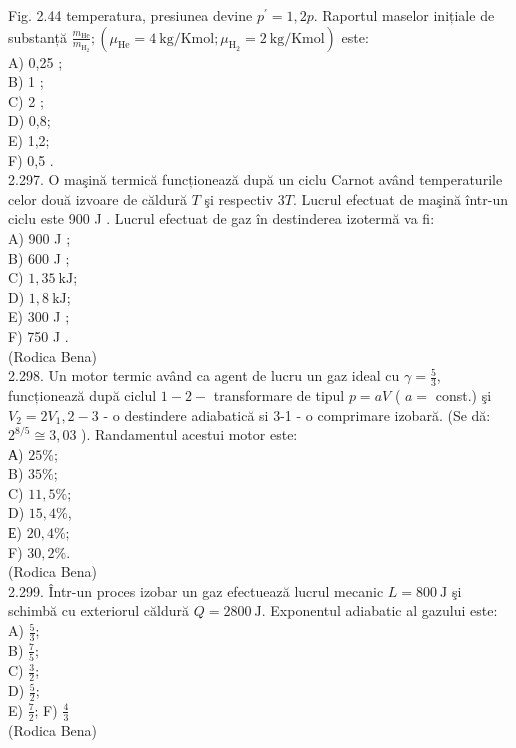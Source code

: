 \documentclass[10pt]{article}
\begin{document}
Fig. 2.44 temperatura, presiunea devine $p^{\prime}=1,2 p$. Raportul maselor inițiale de substanță $\frac{m_{\mathrm{He}}}{m_{\mathrm{H}_{2}}} ;\left(\mu_{\mathrm{He}}=4 \mathrm{~kg} / \mathrm{Kmol} ; \mu_{\mathrm{H}_{2}}=2 \mathrm{~kg} / \mathrm{Kmol}\right)$ este:\\
A) 0,25 ;\\
B) 1 ;\\
C) 2 ;\\
D) 0,8;\\
E) 1,2;\\
F) 0,5 .\\
2.297. O maşină termică funcționează după un ciclu Carnot având temperaturile celor două izvoare de căldură $T$ şi respectiv $3 T$. Lucrul efectuat de maşină într-un ciclu este 900 J . Lucrul efectuat de gaz în destinderea izotermă va fi:\\
A) 900 J ;\\
B) 600 J ;\\
C) $1,35 \mathrm{~kJ}$;\\
D) $1,8 \mathrm{~kJ}$;\\
E) 300 J ;\\
F) 750 J .\\
(Rodica Bena)\\
2.298. Un motor termic având ca agent de lucru un gaz ideal cu $\gamma=\frac{5}{3}$, funcționează după ciclul $1-2-$ transformare de tipul $p=a V$ ( $a=$ const.) şi $V_{2}=2 V_{1}, 2-3$ - o destindere adiabatică si 3-1 - o comprimare izobară. (Se dă: $2^{8 / 5} \cong 3,03$ ). Randamentul acestui motor este:\\
А) $25 \%$;\\
B) $35 \%$;\\
C) $11,5 \%$;\\
D) $15,4 \%$,\\
Е) $20,4 \%$;\\
F) $30,2 \%$.\\
(Rodica Bena)\\
2.299. Într-un proces izobar un gaz efectuează lucrul mecanic $L=800 \mathrm{~J}$ şi schimbă cu exteriorul căldură $Q=2800 \mathrm{~J}$. Exponentul adiabatic al gazului este:\\
A) $\frac{5}{3}$;\\
B) $\frac{7}{5}$;\\
C) $\frac{3}{2}$;\\
D) $\frac{5}{2}$;\\
E) $\frac{7}{2}$; F) $\frac{4}{3}$\\
(Rodica Bena)\\
\end{document}
